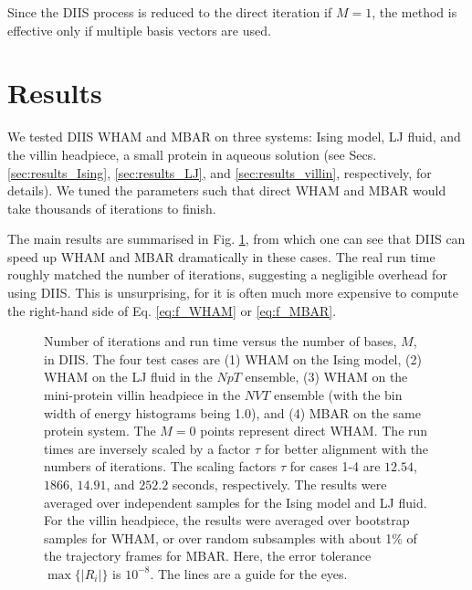 \documentclass{gMOS2e}
\begin{document}
Since the DIIS process is reduced
to the direct iteration
if $M = 1$,
the method is effective
only if multiple basis vectors are used.
%




\section{Results}





We tested DIIS WHAM and MBAR on three systems:
Ising model, LJ fluid,
and the villin headpiece, a small protein in aqueous solution
(see Secs.
\ref{sec:results_Ising}, \ref{sec:results_LJ}, and
\ref{sec:results_villin},
respectively,
for details).
%
We tuned the parameters
such that direct WHAM and MBAR
would take thousands of iterations
to finish.



The main results
are summarised
in Fig. \ref{fig:nsnt},
from which one can see that
DIIS can speed up WHAM and MBAR
dramatically in these cases.
%
The real run time roughly matched
the number of iterations,
suggesting a negligible overhead for using DIIS.
%
This is unsurprising,
for it is often much more expensive to compute
the right-hand side of
Eq. \eqref{eq:f_WHAM} or \eqref{eq:f_MBAR}.



\begin{figure}[h]
\begin{center}
  \caption{
    \label{fig:nsnt}
    Number of iterations
    and run time
    versus the number of bases, $M$,
    in DIIS.
    The four test cases are
    (1) WHAM on the Ising model,
    (2) WHAM on the LJ fluid in the $NpT$ ensemble,
    (3) WHAM on the mini-protein villin headpiece in the $NVT$ ensemble
    (with the bin width of energy histograms being 1.0), and
    (4) MBAR on the same protein system.
    The $M = 0$ points represent direct WHAM.
    The run times are inversely scaled
    by a factor $\tau$
    for better alignment with the numbers of iterations.
    The scaling factors $\tau$ for cases 1-4 are
    $12.54$, $1866$, $14.91$, and $252.2$ seconds,
    respectively.
    The results were averaged
    over independent samples
    for the Ising model and LJ fluid.
    For the villin headpiece,
    the results were averaged over
    bootstrap\cite{
    newman, efron1979, hub2010}
    samples for WHAM,
    or over random subsamples with about 1\% of the trajectory frames
    for MBAR.
    Here, the error tolerance
    $\max \{ |R_i| \}$ is $10^{-8}$.
    The lines are a guide for the eyes.
  }
\end{center}
\end{figure}
\end{document}
